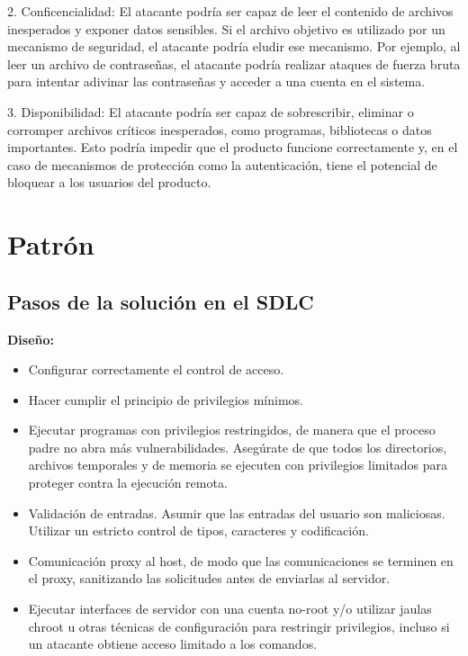 2. Conficencialidad: El atacante podría ser capaz de leer el contenido de archivos inesperados y exponer datos sensibles. Si el archivo objetivo es utilizado por un mecanismo de seguridad, el atacante podría eludir ese mecanismo. Por ejemplo, al leer un archivo de contraseñas, el atacante podría realizar ataques de fuerza bruta para intentar adivinar las contraseñas y acceder a una cuenta en el sistema.

3. Disponibilidad: El atacante podría ser capaz de sobrescribir, eliminar o corromper archivos críticos inesperados, como programas, bibliotecas o datos importantes. Esto podría impedir que el producto funcione correctamente y, en el caso de mecanismos de protección como la autenticación, tiene el potencial de bloquear a los usuarios del producto.


\section{Patrón}

\subsection{Pasos de la solución en el SDLC}

\textbf{Diseño:}

\begin{itemize}
    \item Configurar correctamente el control de acceso.
    \item Hacer cumplir el principio de privilegios mínimos.
    \item Ejecutar programas con privilegios restringidos, de manera que el proceso padre no abra más vulnerabilidades. Asegúrate de que todos los directorios, archivos temporales y de memoria se ejecuten con privilegios limitados para proteger contra la ejecución remota.
    \item Validación de entradas. Asumir que las entradas del usuario son maliciosas. Utilizar un estricto control de tipos, caracteres y codificación.
    \item Comunicación proxy al host, de modo que las comunicaciones se terminen en el proxy, sanitizando las solicitudes antes de enviarlas al servidor.
    \item Ejecutar interfaces de servidor con una cuenta no-root y/o utilizar jaulas chroot u otras técnicas de configuración para restringir privilegios, incluso si un atacante obtiene acceso limitado a los comandos.
\end{itemize}

